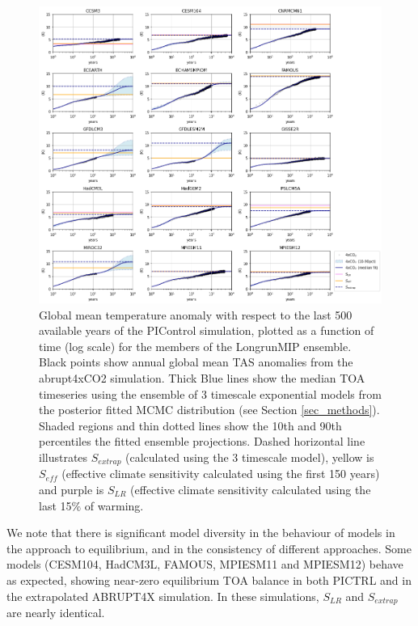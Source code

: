 \documentclass[esd, article]{copernicus}
\begin{document}
\begin{figure}
    \centering
    \includegraphics[width=\linewidth]{t_extrap_lrmip.png}
    \caption{Global mean temperature anomaly with respect to the last 500 available years of the PIControl simulation, plotted as a function of time (log scale) for the members of the LongrunMIP ensemble.  Black points show annual global mean TAS anomalies from the abrupt4xCO2 simulation.  Thick Blue lines show the median TOA timeseries using the ensemble of 3 timescale exponential models from the posterior fitted MCMC distribution (see Section \ref{sec_methods}).  Shaded regions and thin dotted lines show the 10th and 90th percentiles the fitted ensemble projections.  Dashed horizontal line illustrates $S_{extrap}$ (calculated using the 3 timescale model), yellow is $S_{eff}$ (effective climate sensitivity calculated using the first 150 years) and purple is $S_{LR}$ (effective climate sensitivity calculated using the last 15$\%$ of warming.}
    \label{fig:t_extrap_lrmip}
\end{figure}

We note that there is significant model diversity in the behaviour of models in the approach to equilibrium, and in the consistency of different approaches.  Some models  (CESM104, HadCM3L, FAMOUS, MPIESM11 and MPIESM12) behave as expected, showing near-zero equilibrium TOA balance in both PICTRL and in the extrapolated ABRUPT4X simulation.  In these simulations, $S_{LR}$ and $S_{extrap}$ are nearly identical.  
\end{document}
